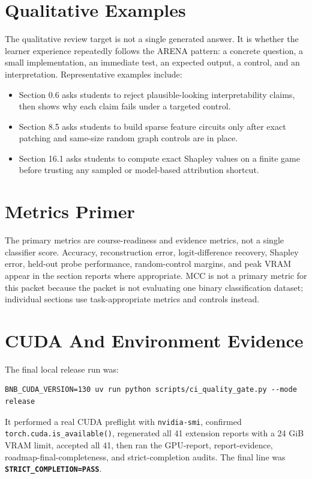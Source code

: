 \documentclass[11pt]{article}
\newcommand{\code}[1]{\texttt{#1}}
\newcommand{\status}[1]{\textbf{\texttt{#1}}}
\begin{document}
\section{Qualitative Examples}
The qualitative review target is not a single generated answer. It is whether
the learner experience repeatedly follows the ARENA pattern: a concrete
question, a small implementation, an immediate test, an expected output, a
control, and an interpretation. Representative examples include:
\begin{itemize}
  \item Section 0.6 asks students to reject plausible-looking interpretability
  claims, then shows why each claim fails under a targeted control.
  \item Section 8.5 asks students to build sparse feature circuits only after
  exact patching and same-size random graph controls are in place.
  \item Section 16.1 asks students to compute exact Shapley values on a finite
  game before trusting any sampled or model-based attribution shortcut.
\end{itemize}

\section{Metrics Primer}
The primary metrics are course-readiness and evidence metrics, not a single
classifier score. Accuracy, reconstruction error, logit-difference recovery,
Shapley error, held-out probe performance, random-control margins, and peak
VRAM appear in the section reports where appropriate. MCC is not a primary
metric for this packet because the packet is not evaluating one binary
classification dataset; individual sections use task-appropriate metrics and
controls instead.

\section{CUDA And Environment Evidence}
The final local release run was:
\begin{verbatim}
BNB_CUDA_VERSION=130 uv run python scripts/ci_quality_gate.py --mode release
\end{verbatim}
It performed a real CUDA preflight with \code{nvidia-smi}, confirmed
\code{torch.cuda.is\_available()}, regenerated all 41 extension reports with a
24 GiB VRAM limit, accepted all 41, then ran the GPU-report, report-evidence,
roadmap-final-completeness, and strict-completion audits. The final line was
\status{STRICT\_COMPLETION=PASS}.
\end{document}
